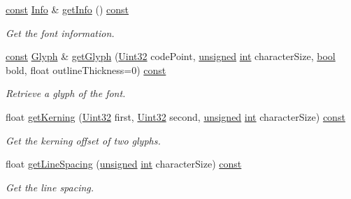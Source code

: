 \begin{DoxyCompactItemize}
\hyperlink{term__entry_8h_a57bd63ce7f9a353488880e3de6692d5a}{const} \hyperlink{structsf_1_1_font_1_1_info}{Info} \& \hyperlink{classsf_1_1_font_ac4b60eeb5adfc98a2c7727a0f3ce1029}{get\-Info} () \hyperlink{term__entry_8h_a57bd63ce7f9a353488880e3de6692d5a}{const} 
\begin{DoxyCompactList}\small\item\em Get the font information. \end{DoxyCompactList}\item 
\hyperlink{term__entry_8h_a57bd63ce7f9a353488880e3de6692d5a}{const} \hyperlink{classsf_1_1_glyph}{Glyph} \& \hyperlink{classsf_1_1_font_aa317dc5963cdd5f07057dc85b559472b}{get\-Glyph} (\hyperlink{namespacesf_aa746fb1ddef4410bddf198ebb27e727c}{Uint32} code\-Point, \hyperlink{curses_8priv_8h_aca40206900cfc164654362fa8d4ad1e6}{unsigned} \hyperlink{term__entry_8h_ad65b480f8c8270356b45a9890f6499ae}{int} character\-Size, \hyperlink{term__entry_8h_a002004ba5d663f149f6c38064926abac}{bool} bold, float outline\-Thickness=0) \hyperlink{term__entry_8h_a57bd63ce7f9a353488880e3de6692d5a}{const} 
\begin{DoxyCompactList}\small\item\em Retrieve a glyph of the font. \end{DoxyCompactList}\item 
float \hyperlink{classsf_1_1_font_a03b32e8cf6448d269f6dd9d69c138f68}{get\-Kerning} (\hyperlink{namespacesf_aa746fb1ddef4410bddf198ebb27e727c}{Uint32} first, \hyperlink{namespacesf_aa746fb1ddef4410bddf198ebb27e727c}{Uint32} second, \hyperlink{curses_8priv_8h_aca40206900cfc164654362fa8d4ad1e6}{unsigned} \hyperlink{term__entry_8h_ad65b480f8c8270356b45a9890f6499ae}{int} character\-Size) \hyperlink{term__entry_8h_a57bd63ce7f9a353488880e3de6692d5a}{const} 
\begin{DoxyCompactList}\small\item\em Get the kerning offset of two glyphs. \end{DoxyCompactList}\item 
float \hyperlink{classsf_1_1_font_a0a9b9ab6aaa50a572057127aec7c3adc}{get\-Line\-Spacing} (\hyperlink{curses_8priv_8h_aca40206900cfc164654362fa8d4ad1e6}{unsigned} \hyperlink{term__entry_8h_ad65b480f8c8270356b45a9890f6499ae}{int} character\-Size) \hyperlink{term__entry_8h_a57bd63ce7f9a353488880e3de6692d5a}{const} 
\begin{DoxyCompactList}\small\item\em Get the line spacing. \end{DoxyCompactList}\item 

\end{DoxyCompactItemize}
